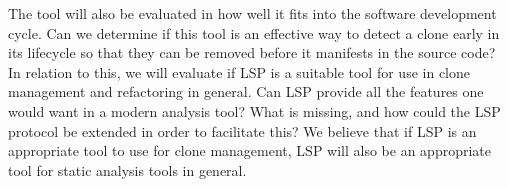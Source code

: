 The tool will also be evaluated in how well it fits into the software development cycle.
Can we determine if this tool is an effective way to detect a clone early in its lifecycle
so that they can be removed before it manifests in the source code? In relation to this,
we will evaluate if LSP is a suitable tool for use in clone management and refactoring in
general. Can LSP provide all the features one would want in a modern analysis tool? What
is missing, and how could the LSP protocol be extended in order to facilitate this? We
believe that if LSP is an appropriate tool to use for clone management, LSP will also be
an appropriate tool for static analysis tools in general.
